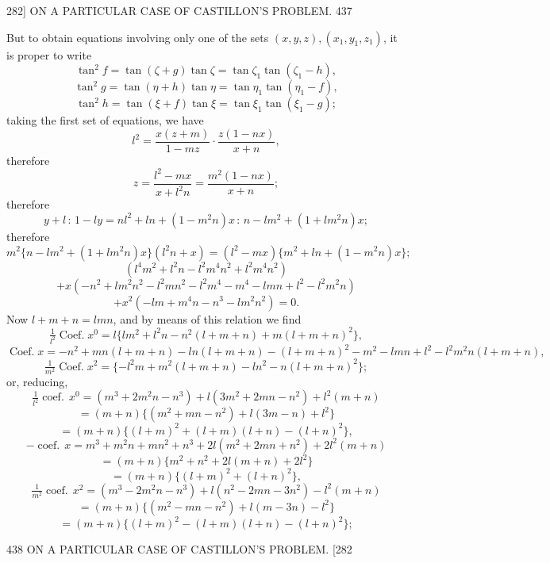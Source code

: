 \documentclass[11pt]{article}
\begin{document}
\begin{center}
\textsc{282]} \hfill ON A PARTICULAR CASE OF CASTILLON'S PROBLEM. \hfill 437
\end{center}

But to obtain equations involving only one of the sets $(x,y,z),(x_{1},y_{1},z_{1})$,
it is proper to write
\[ \tan^{2}f=\tan(\zeta+g)\tan\zeta=\tan\zeta_{1}\tan(\zeta_{1}-h), \]
\[ \tan^{2}g=\tan(\eta+h)\tan\eta=\tan\eta_{1}\tan(\eta_{1}-f), \]
\[ \tan^{2}h=\tan(\xi+f)\tan\xi=\tan\xi_{1}\tan(\xi_{1}-g); \]
taking the first set of equations, we have
\[ l^{2}=\dfrac{x(z+m)}{1-mz}\cdot\dfrac{z(1-nx)}{x+n}, \]
therefore
\[ z=\dfrac{l^{2}-mx}{x+l^{2}n}=\dfrac{m^{2}(1-nx)}{x+n}; \]
therefore
\[ y+l\,:\,1-ly=nl^{2}+ln+(1-m^{2}n)x\,:\,n-lm^{2}+(1+lm^{2}n)x; \]
therefore
\[ m^{2}\{n-lm^{2}+(1+lm^{2}n)x\}(l^{2}n+x)=(l^{2}-mx)\{m^{2}+ln+(1-m^{2}n)x\}; \]
\[ (l^{4}m^{2}+l^{2}n-l^{2}m^{4}n^{2}+l^{2}m^{4}n^{2}) \]
\[ +x(-n^{2}+lm^{2}n^{2}-l^{2}mn^{2}-l^{2}m^{4}-m^{4}-lmn+l^{2}-l^{2}m^{2}n) \]
\[ +x^{2}(-lm+m^{4}n-n^{3}-lm^{2}n^{2})=0. \]
Now $l+m+n=lmn$, and by means of this relation we find
\[ \tfrac{1}{l^{2}}\operatorname{Coef.}x^{0}=l\{lm^{2}+l^{2}n-n^{2}(l+m+n)+m(l+m+n)^{2}\}, \]
\[ \operatorname{Coef.}x=-n^{2}+mn(l+m+n)-ln(l+m+n)-(l+m+n)^{2}-m^{2}\!-lmn+l^{2}-l^{2}m^{2}n(l+m+n), \]
\[ \tfrac{1}{m^{2}}\operatorname{Coef.}x^{2}=\{-l^{2}m+m^{2}(l+m+n)-ln^{2}-n(l+m+n)^{2}\}; \]
or, reducing,
\[ \tfrac{1}{l^{2}}\operatorname{coef.}\,x^{0}=(m^{3}+2m^{2}n-n^{3})+l(3m^{2}+2mn-n^{2})+l^{2}(m+n) \]
\[ =(m+n)\{(m^{2}+mn-n^{2})+l(3m-n)+l^{2}\} \]
\[ =(m+n)\{(l+m)^{2}+(l+m)(l+n)-(l+n)^{2}\}, \]
\[ -\operatorname{coef.}\,x=m^{3}+m^{2}n+mn^{2}+n^{3}+2l(m^{2}+2mn+n^{2})+2l^{2}(m+n) \]
\[ =(m+n)\{m^{2}+n^{2}+2l(m+n)+2l^{2}\} \]
\[ =(m+n)\{(l+m)^{2}+(l+n)^{2}\}, \]
\[ \tfrac{1}{m^{2}}\operatorname{coef.}\,x^{2}=(m^{3}-2m^{2}n-n^{3})+l(n^{2}-2mn-3n^{2})-l^{2}(m+n) \]
\[ =(m+n)\{(m^{2}-mn-n^{2})+l(m-3n)-l^{2}\} \]
\[ =(m+n)\{(l+m)^{2}-(l+m)(l+n)-(l+n)^{2}\}; \]

\begin{center}
438 \hfill ON A PARTICULAR CASE OF CASTILLON'S PROBLEM. \hfill \textsc{[282}
\end{center}
\end{document}
